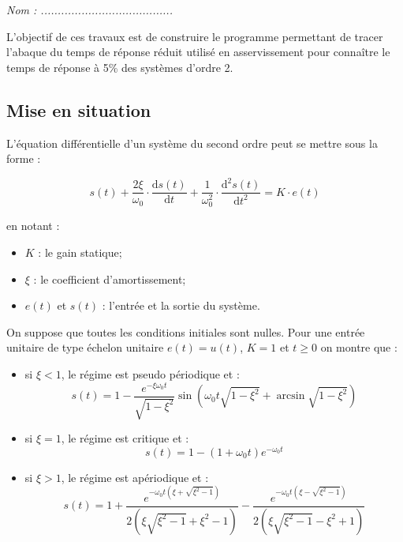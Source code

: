 \documentclass[10pt]{article}
\newif\ifprof
\begin{document}


\ifprof
\begin{center}
\large{\textit{Éléments de corrigé}}
\end{center}
\else
\begin{flushright}
\large{\textsl{Nom : .......................................}}
\end{flushright}
\fi

\vspace{1cm}

\begin{obj}

L'objectif de ces travaux est de construire le programme permettant de tracer l'abaque du temps de réponse réduit utilisé en asservissement pour connaître le temps de réponse à 5\% des systèmes d'ordre 2. 
\end{obj}

\subsection*{Mise en situation}

L'équation différentielle d'un système du second ordre peut se mettre sous la forme :

\vspace{.25cm}

\begin{minipage}[c]{.48\linewidth}
$$
s(t)
+\dfrac{2\xi}{\omega_0}\cdot \dfrac{\text{d}s(t)}{\text{d}t}
+\dfrac{1}{\omega_0^2}\cdot \dfrac{\text{d}^2s(t)}{\text{d}t^2}
= K\cdot e(t)
$$
\end{minipage}\hfill
\begin{minipage}[c]{.48\linewidth}
en notant :
\begin{itemize}
\item $K$ : le gain statique;
\item $\xi$ : le coefficient d'amortissement;
\item $e(t)$ et $s(t)$ : l'entrée et la sortie du système. 
\end{itemize}
\end{minipage}

\vspace{.5cm}

On suppose que toutes les conditions initiales sont nulles. Pour une entrée unitaire de type échelon unitaire $e(t)=u(t)$, $K=1$ et $t\geq0$ on montre que : 
\begin{itemize}
\item si $\xi <1$, le régime est pseudo périodique et :
$$
s(t)=1-\dfrac{e^{-\xi\omega_0 t}}{\sqrt{1-\xi^2}}\sin\left(  \omega_0 t\sqrt{1-\xi^2}+\arcsin \sqrt{1-\xi^2} \right)
$$
\item si $\xi=1$, le régime est critique et : 
$$
s(t)=1-\left(1+\omega_0 t \right)e^{-\omega_0 t} 
$$
\item si $\xi>1$, le régime est apériodique et : 
$$
s(t)=1
+\dfrac{e^{- \omega_0 t\left( \xi + \sqrt{\xi^2-1}\right)}}{2\left(\xi\sqrt{\xi^2-1}+\xi^2-1 \right)}
-\dfrac{e^{- \omega_0 t \left( \xi - \sqrt{\xi^2-1}\right)}}{2\left(\xi\sqrt{\xi^2-1}-\xi^2+1 \right)}
$$
\end{itemize} 
\end{document}
